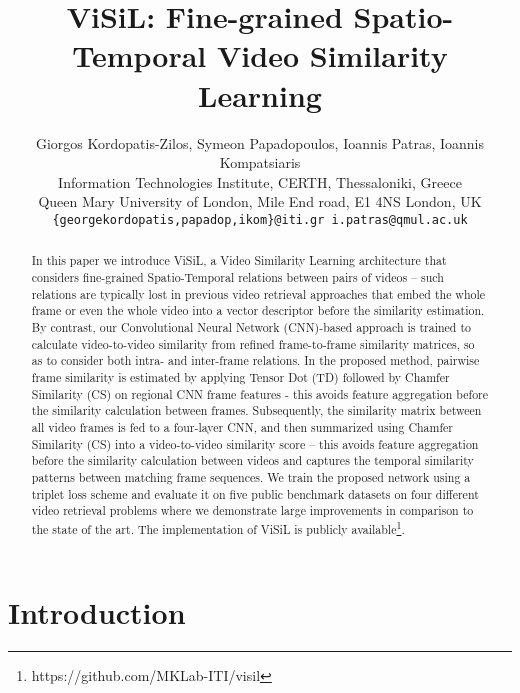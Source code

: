 \documentclass[10pt,twocolumn,letterpaper]{article}
\begin{document}
\title{ViSiL: Fine-grained Spatio-Temporal Video Similarity Learning} 

\author{Giorgos Kordopatis-Zilos, Symeon Papadopoulos, Ioannis Patras, Ioannis Kompatsiaris\\
Information Technologies Institute, CERTH, Thessaloniki, Greece \\
Queen Mary University of London, Mile End road, E1 4NS London, UK \\
{\tt\small \{georgekordopatis,papadop,ikom\}@iti.gr \hspace*{1em} i.patras@qmul.ac.uk}}

\maketitle



\begin{abstract}
In this paper we introduce ViSiL, a Video Similarity Learning architecture that considers fine-grained Spatio-Temporal relations between pairs of videos -- such relations are typically lost in previous video retrieval approaches that embed the whole frame or even the whole video into a vector descriptor before the similarity estimation. By contrast, our Convolutional Neural Network (CNN)-based approach is trained to calculate video-to-video similarity from refined frame-to-frame similarity matrices, so as to consider both intra- and inter-frame relations. In the proposed method, pairwise frame similarity is estimated by applying Tensor Dot (TD) followed by Chamfer Similarity (CS) on regional CNN frame features - this avoids feature aggregation before the similarity calculation between frames. Subsequently, the similarity matrix between all video frames is fed to a four-layer CNN, and then summarized using Chamfer Similarity (CS) into a video-to-video similarity score -- this avoids feature aggregation before the similarity calculation between videos and captures the temporal similarity patterns between matching frame sequences. We train the proposed network using a triplet loss scheme and evaluate it on five public benchmark datasets on four different video retrieval problems where we demonstrate large improvements in comparison to the state of the art. The implementation of ViSiL is publicly available\footnote{https://github.com/MKLab-ITI/visil}.
\end{abstract}

\section{Introduction}
\end{document}
